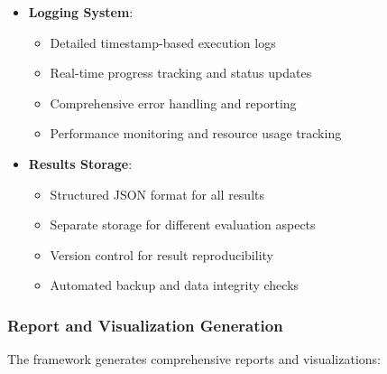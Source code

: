\begin{itemize}
    \item \textbf{Logging System}:
    \begin{itemize}
        \item Detailed timestamp-based execution logs
        \item Real-time progress tracking and status updates
        \item Comprehensive error handling and reporting
        \item Performance monitoring and resource usage tracking
    \end{itemize}

    \item \textbf{Results Storage}:
    \begin{itemize}
        \item Structured JSON format for all results
        \item Separate storage for different evaluation aspects
        \item Version control for result reproducibility
        \item Automated backup and data integrity checks
    \end{itemize}
\end{itemize}

\subsubsection{Report and Visualization Generation}
The framework generates comprehensive reports and visualizations:

